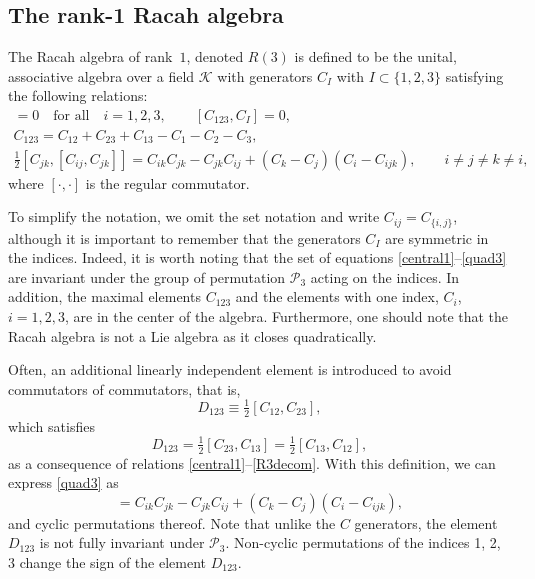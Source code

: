 \documentclass[10pt,a4paper]{amsart}
\numberwithin{equation}{section}
\begin{document}
\subsection{The rank-1 Racah algebra}
\begin{Definition}
The Racah algebra of rank~$1$, denoted $R(3)$ is defined to be the unital, associative algebra over a field $\mathcal{K}$ with generators $C_{I}$ with $I \subset \{ 1,2,3\}$ satisfying the following relations:
\begin{gather}
[C_{i},C_{I}] = 0 \quad \mbox{for all}\quad i=1,2,3, \qquad [C_{123},C_{I}] = 0,\label{central1}\\
C_{123}=C_{12}+C_{23}+C_{13}-C_1 -C_2-C_3, \label{R3decom}\\
\tfrac{1}{2} [C_{jk},[C_{ij}, C_{jk}]]= C_{ik}C_{jk}-C_{jk}C_{ij}+(C_k-C_j)(C_i-C_{ijk}), \qquad i\neq j \neq k\neq i,\label{quad3}
\end{gather}
where $[\cdot,\cdot]$ is the regular commutator.
\end{Definition}

 To simplify the notation, we omit the set notation and write $C_{ij} = C_{\{ i,j\}}$, although it is important to remember that the generators $C_I$ are symmetric in the indices. Indeed, it is worth noting that the set of equations \eqref{central1}--\eqref{quad3} are invariant under the group of permutation $\mathcal{P}_3$ acting on the indices. In addition, the maximal elements $C_{123}$ and the elements with one index, $C_i$, $i=1,2,3$, are in the center of the algebra. Furthermore, one should note that the Racah algebra is not a Lie algebra as it closes quadratically.

Often, an additional linearly independent element is introduced to avoid commutators of commutators, that is,
\begin{equation}%
D_{123}\equiv \tfrac 12 [C_{12}, C_{23}],
\end{equation}
which satisfies
\begin{equation}
D_{123}= \tfrac12 [C_{23}, C_{13}]= \tfrac12 [C_{13}, C_{12}],\label{D123alt}
\end{equation}
as a consequence of relations \eqref{central1}--\eqref{R3decom}.
With this definition, we can express \eqref{quad3} as
\begin{equation}
[C_{jk}, D_{ijk}] =C_{ik}C_{jk}-C_{jk}C_{ij}+(C_k-C_j)(C_i-C_{ijk}),\label{rank1inner}
\end{equation}
and cyclic permutations thereof. Note that unlike the $C$ generators, the element $D_{123}$ is not fully invariant under $\mathcal{P}_3$. Non-cyclic permutations of the indices 1, 2, 3 change the sign of the element $D_{123}$.
\end{document}
